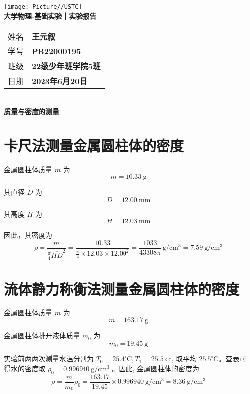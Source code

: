 \documentclass[10pt,a4paper]{article}
\newcommand{\nexp}{质量与密度的测量}
\begin{document}
	\vspace*{-5em}
	\begin{center}
		\texttt{[image: Picture//USTC]}\\
		\Large \textbf{大学物理-基础实验｜实验报告}\\[5mm]

		\normalsize
		\begin{tabular}{ll}
			姓名 & \textbf{王元叙}\\
			学号 & \textbf{PB22000195}\\
			班级 & \textbf{22级少年班学院5班}\\
			日期 & \textbf{2023年6月20日}\\	
		\end{tabular}\\[5mm]

		\LARGE \textbf{\nexp}\\[5mm]	

	\end{center}


	\section{卡尺法测量金属圆柱体的密度}

	金属圆柱体质量 $m$ 为
	$$
	m=10.33 \mathrm{~g}
	$$

	其直径 $D$ 为
	$$
	D=12.00 \mathrm{~mm}
	$$

	其高度 $H$ 为
	$$
	H=12.03 \mathrm{~mm}
	$$

	因此，其密度为
	$$
	\rho=\frac{\bar{m}}{\frac{\pi}{4} \overline{H D}^2}=\frac{10.33}{\frac{\pi}{4} \times 12.03 \times 12.00^2} = \frac{1033}{43308 \pi} \mathrm{~g} / \mathrm{cm}^3=7.59 \mathrm{~g} / \mathrm{cm}^3
	$$

	\section{流体静力称衡法测量金属圆柱体的密度}

	金属圆柱体质量 $m$ 为
	$$
	m=163.17\mathrm{~g}
	$$

	金属圆柱体排开液体质量 $m_0$ 为
	$$
	m_0=19.45\mathrm{~g}
	$$

	实验前两两次测量水温分别为 $T_0=25.4 ^\circ \mathrm{C},T_1=25.5 \circ \mathrm{c}$, 取平均 $25.5^\circ\mathrm{C}$。查表可得水的密度取 $\rho_0=0.996940 \mathrm{~g} / \mathrm{cm}^3$ 。因此, 金属圆柱体的密度为
	$$
	\rho=\frac{{m}}{{m_0}} \rho_0=\frac{163.17}{19.45} \times 0.996940 \mathrm{~g} / \mathrm{cm}^3=8.36 \mathrm{~g} / \mathrm{cm}^3 
	$$
\end{document}
